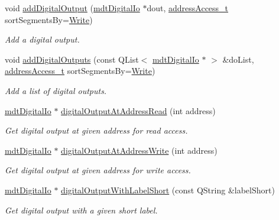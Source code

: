 \begin{DoxyCompactItemize}
void \hyperlink{classmdt_device_ios_afb202474ccc9b0ca58385b84283fecd4}{add\-Digital\-Output} (\hyperlink{classmdt_digital_io}{mdt\-Digital\-Io} $\ast$dout, \hyperlink{classmdt_device_ios_a72fc3fdcd905d669b1e90496e808d6dd}{address\-Access\-\_\-t} sort\-Segments\-By=\hyperlink{classmdt_device_ios_a72fc3fdcd905d669b1e90496e808d6dda29a5b11f060f7fce671b9ced4bb4ef7a}{Write})
\begin{DoxyCompactList}\small\item\em Add a digital output. \end{DoxyCompactList}\item 
void \hyperlink{classmdt_device_ios_adf6a8efe1f82a9cfeea12afce6d58a5d}{add\-Digital\-Outputs} (const Q\-List$<$ \hyperlink{classmdt_digital_io}{mdt\-Digital\-Io} $\ast$ $>$ \&do\-List, \hyperlink{classmdt_device_ios_a72fc3fdcd905d669b1e90496e808d6dd}{address\-Access\-\_\-t} sort\-Segments\-By=\hyperlink{classmdt_device_ios_a72fc3fdcd905d669b1e90496e808d6dda29a5b11f060f7fce671b9ced4bb4ef7a}{Write})
\begin{DoxyCompactList}\small\item\em Add a list of digital outputs. \end{DoxyCompactList}\item 
\hyperlink{classmdt_digital_io}{mdt\-Digital\-Io} $\ast$ \hyperlink{classmdt_device_ios_a87647e98e2574a1e5f7c8780f9c33b13}{digital\-Output\-At\-Address\-Read} (int address)
\begin{DoxyCompactList}\small\item\em Get digital output at given address for read access. \end{DoxyCompactList}\item 
\hyperlink{classmdt_digital_io}{mdt\-Digital\-Io} $\ast$ \hyperlink{classmdt_device_ios_af50bc664e381265b93b1e8faf7f883b7}{digital\-Output\-At\-Address\-Write} (int address)
\begin{DoxyCompactList}\small\item\em Get digital output at given address for write access. \end{DoxyCompactList}\item 
\hyperlink{classmdt_digital_io}{mdt\-Digital\-Io} $\ast$ \hyperlink{classmdt_device_ios_acecc7f9abb21613fed90212eef4d4dda}{digital\-Output\-With\-Label\-Short} (const Q\-String \&label\-Short)
\begin{DoxyCompactList}\small\item\em Get digital output with a given short label. \end{DoxyCompactList}\item 

\end{DoxyCompactItemize}
